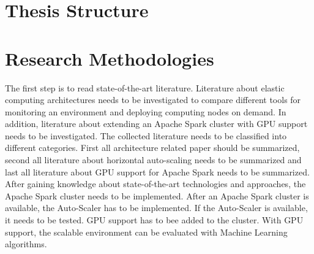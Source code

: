 \section{Thesis Structure}

\section{Research Methodologies}
The first step is to read state-of-the-art literature. Literature about elastic computing architectures needs to be investigated to compare different tools for monitoring an environment and deploying computing nodes on demand.
In addition, literature about extending an Apache Spark cluster with GPU support needs to be investigated.
The collected literature needs to be classified into different categories. First all architecture related paper should be summarized, second all literature about horizontal auto-scaling needs to be summarized and last all literature about GPU support for Apache Spark needs to be summarized.
After gaining knowledge about state-of-the-art technologies and approaches, the Apache Spark cluster needs to be implemented.
After an Apache Spark cluster is available, the Auto-Scaler has to be implemented.
If the Auto-Scaler is available, it needs to be tested.
GPU support has to bee added to the cluster.
With GPU support, the scalable environment can be evaluated with Machine Learning algorithms.
